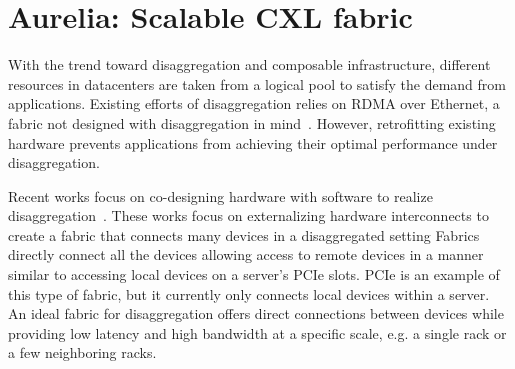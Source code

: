 \chapter{Aurelia: Scalable CXL fabric}
\label{aurelia:chap}

%
With the trend toward disaggregation and composable infrastructure, different resources in datacenters are taken from a logical pool to satisfy the demand from applications.
%
Existing efforts of disaggregation relies on RDMA over Ethernet, a fabric not designed with disaggregation in mind~\cite{legoos:osdi:2018, far-memory:eurosys:2020, leap:atc:2020,aifm:osdi:2020,carbink:osdi:2022,hydra:fast:2022,canvas:nsdi:2023}.
%
However, retrofitting existing hardware prevents applications from achieving their optimal performance under disaggregation. 
%
%

Recent works focus on co-designing hardware with software to realize disaggregation~\cite{kona:asplos:2021, intel-cxl:ieee-micro:2023, tpp:asplos:2023, pond:asplos:2023}.
%
These works focus on externalizing hardware interconnects to create a fabric that connects many devices in a disaggregated setting
%
Fabrics directly connect all the devices allowing access to remote devices in a manner similar to accessing local devices on a server's PCIe slots.  
%
PCIe is an example of this type of fabric, but it currently only connects local devices within a server.
%
%
%
An ideal fabric for disaggregation offers direct connections between devices while providing low latency and high bandwidth at a specific scale, e.g. a single rack or a few neighboring racks.

